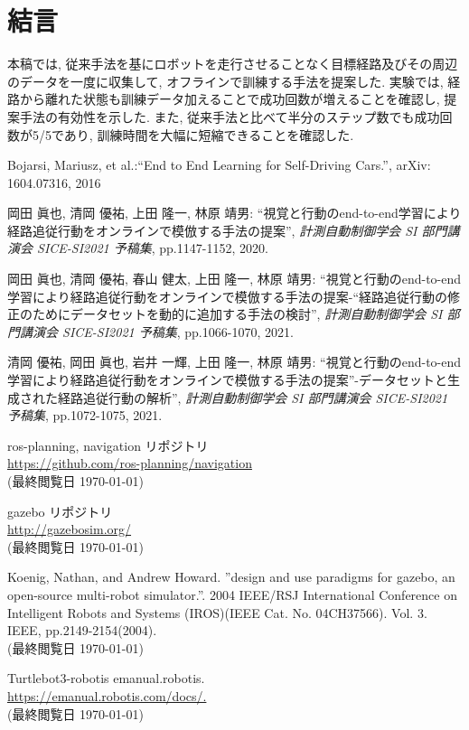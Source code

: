 \documentclass{ujarticle}
\begin{document}
\newpage
\section{結言}%
本稿では, 従来手法を基にロボットを走行させることなく目標経路及びその周辺のデータを一度に収集して, オフラインで訓練する手法を提案した. 実験では, 経路から離れた状態も訓練データ加えることで成功回数が増えることを確認し, 提案手法の有効性を示した. また, 従来手法と比べて半分のステップ数でも成功回数が5/5であり, 訓練時間を大幅に短縮できることを確認した. 


\footnotesize
\begin{thebibliography}{99}

Bojarsi, Mariusz, et al.:``End to End Learning for Self-Driving Cars.'', arXiv: 1604.07316, 2016

岡田 眞也, 清岡 優祐, 上田 隆一, 林原 靖男: ``視覚と行動のend-to-end学習により経路追従行動をオンラインで模倣する手法の提案'', \textit{計測自動制御学会 SI 部門講演会 SICE-SI2021 予稿集}, pp.1147-1152, 2020.

岡田 眞也, 清岡 優祐, 春山 健太, 上田 隆一, 林原 靖男: ``視覚と行動のend-to-end学習により経路追従行動をオンラインで模倣する手法の提案-“経路追従行動の修正のためにデータセットを動的に追加する手法の検討'', \textit{計測自動制御学会 SI 部門講演会 SICE-SI2021 予稿集}, pp.1066-1070, 2021.

清岡 優祐, 岡田 眞也, 岩井 一輝, 上田 隆一, 林原 靖男: ``視覚と行動のend-to-end学習により経路追従行動をオンラインで模倣する手法の提案''-データセットと生成された経路追従行動の解析'', \textit{計測自動制御学会 SI 部門講演会 SICE-SI2021 予稿集}, pp.1072-1075, 2021.

ros-planning, navigation リポジトリ\\
\url{https://github.com/ros-planning/navigation}\\
(最終閲覧日 \today)

gazebo リポジトリ\\
\url{http://gazebosim.org/}\\
(最終閲覧日 \today)

Koenig, Nathan, and Andrew Howard. ”design and use paradigms for gazebo, an open-source multi-robot simulator.”. 2004 IEEE/RSJ International Conference on Intelligent Robots and Systems (IROS)(IEEE Cat. No. 04CH37566). Vol. 3. IEEE, pp.2149-2154(2004).\\
(最終閲覧日 \today)

Turtlebot3-robotis emanual.robotis.\\
\url{https://emanual.robotis.com/docs/.}\\
(最終閲覧日 \today)

\end{thebibliography}

\normalsize
\end{document}
